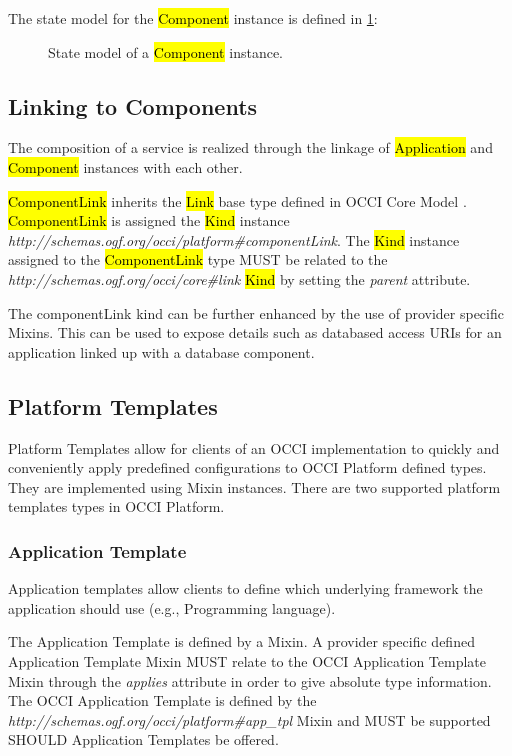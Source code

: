 \documentclass[10pt,a4paper]{article}
\begin{document}
The state model for the \hl{Component} instance is defined in \ref{fig:component_state}:

\begin{figure}[!h]
	{\centering {} \par}
	\caption{State model of a \hl{Component} instance.}
	\label{fig:component_state}
\end{figure}

\subsection{Linking to Components}

The composition of a service is realized through the linkage of \hl{Application} and \hl{Component} instances with each other.

\hl{ComponentLink} inherits the \hl{Link} base type defined in OCCI Core Model \cite{occi:core}. \hl{ComponentLink} is assigned the \hl{Kind} instance \textit{http://schemas.ogf.org/occi/platform\#componentLink}. The \hl{Kind} instance assigned to the \hl{ComponentLink} type MUST be related to the \textit{http://schemas.ogf.org/occi/core\#link} \hl{Kind} by setting the \textit{parent} attribute.

The componentLink kind can be further enhanced by the use of  provider specific Mixins. This can be used to expose details such as databased access URIs for an application linked up with a database component.

\subsection{Platform Templates}
Platform Templates allow for clients of an OCCI implementation to quickly and conveniently apply predefined configurations to OCCI Platform defined types. They are implemented using Mixin instances. There are two supported platform templates types in OCCI Platform.

\subsubsection{Application Template}
Application templates allow clients to define which underlying framework the application should use (e.g., Programming language).

The Application Template is defined by a Mixin. A provider specific defined Application Template Mixin MUST relate to the OCCI Application Template Mixin through the \textit{applies} attribute in order to give absolute type information. The OCCI Application Template is defined by the \textit{http://schemas.ogf.org/occi/platform\#app\_tpl} Mixin and MUST be supported SHOULD Application Templates be offered.
\end{document}
